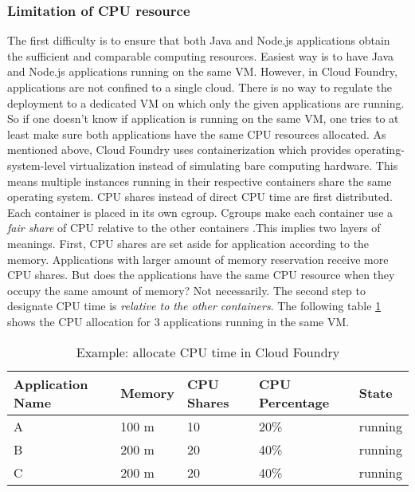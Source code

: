 \subsubsection{Limitation of CPU resource}
\label{cpu limitation}
The first difficulty is to ensure that both Java and Node.js applications obtain the sufficient and comparable computing resources. Easiest way is to have Java and Node.js applications running on the same VM. However, in Cloud Foundry, applications are not confined to a single cloud. There is no way to regulate the deployment to a dedicated VM on which only the given applications are running. So if one doesn't know if application is running on the same VM, one tries to at least make sure both applications have the same CPU resources allocated. As mentioned above, Cloud Foundry uses containerization which provides operating-system-level virtualization instead of simulating bare computing hardware. This means multiple instances running in their respective containers share the same operating system. CPU shares instead of direct CPU time are first distributed. Each container is placed in its own cgroup. Cgroups make each container use a \textit{fair share} of CPU relative to the other containers \citep{CGroup}.This implies two layers of meanings. First, CPU shares are set aside for application according to the memory. Applications with larger amount of memory reservation receive more CPU shares. But does the applications have the same CPU resource when they occupy the same amount of memory? Not necessarily. The second step to designate CPU time is \textit{relative to the other containers}. The following table \ref{CPU time in Cloud Foundry} shows the CPU allocation for 3 applications running in the same VM. 
\begin{table}[h]
	\caption{Example: allocate CPU time in Cloud Foundry}
	\label{CPU time in Cloud Foundry}
	\renewcommand{\arraystretch}{1.2}
	\centering
	\sffamily
	\begin{footnotesize}
		\begin{tabular}{l l l l l }
			\toprule
			\textbf{Application Name} & \textbf{Memory} & \textbf{CPU Shares}& \textbf{CPU Percentage} }& \textbf{State}\\
			\midrule
		    A 	&	100	m & 10 & 20\%   & running\\
			B	&	200 m & 20 & 40\% & running\\
			C	&	200 m &	20 & 40\% & running\\
			\bottomrule
		\end{tabular}
	\end{footnotesize}
	\rmfamily
\end{table}

